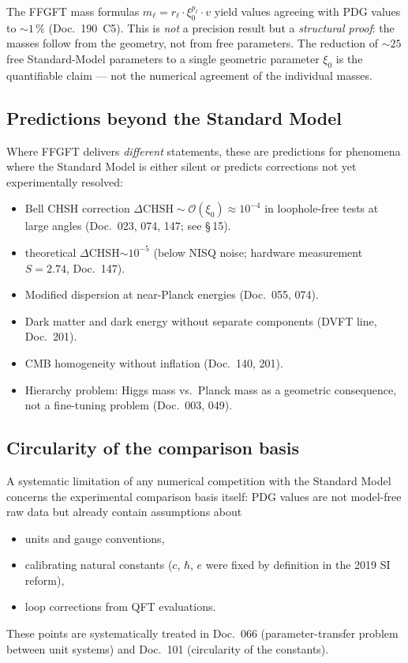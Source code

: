 The FFGFT mass formulas $m_\ell = r_\ell\cdot\xi_0^{p_\ell}\cdot v$
yield values agreeing with PDG values to $\sim 1\,\%$ (Doc.~190~C5).
This is \emph{not} a precision result but a \emph{structural proof}:
the masses follow from the geometry, not from free parameters. The
reduction of $\sim 25$ free Standard-Model parameters to a single
geometric parameter $\xi_0$ is the quantifiable claim --- not the
numerical agreement of the individual masses.

\subsection*{Predictions beyond the Standard Model}

Where FFGFT delivers \emph{different} statements, these are
predictions for phenomena where the Standard Model is either silent
or predicts corrections not yet experimentally resolved:

\begin{itemize}\setlength\itemsep{0pt}
  \item Bell CHSH correction $\Delta\mathrm{CHSH} \sim \mathcal{O}(\xi_0)
        \approx 10^{-4}$ in loophole-free tests at large angles
        (Doc.~023, 074, 147; see \S\,15).
  \item theoretical $\Delta$CHSH$\sim 10^{-5}$ (below NISQ noise;
        hardware measurement $S=2.74$, Doc.~147).
  \item Modified dispersion at near-Planck energies (Doc.~055, 074).
  \item Dark matter and dark energy without separate components
        (DVFT line, Doc.~201).
  \item CMB homogeneity without inflation (Doc.~140, 201).
  \item Hierarchy problem: Higgs mass vs.\ Planck mass as a geometric
        consequence, not a fine-tuning problem (Doc.~003, 049).
\end{itemize}

\subsection*{Circularity of the comparison basis}

A systematic limitation of any numerical competition with the
Standard Model concerns the experimental comparison basis itself:
PDG values are not model-free raw data but already contain assumptions
about
\begin{itemize}\setlength\itemsep{0pt}
  \item units and gauge conventions,
  \item calibrating natural constants ($c$, $\hbar$, $e$ were fixed
        by definition in the 2019 SI reform),
  \item loop corrections from QFT evaluations.
\end{itemize}
These points are systematically treated in Doc.~066 (parameter-transfer
problem between unit systems) and Doc.~101 (circularity of the
constants).

